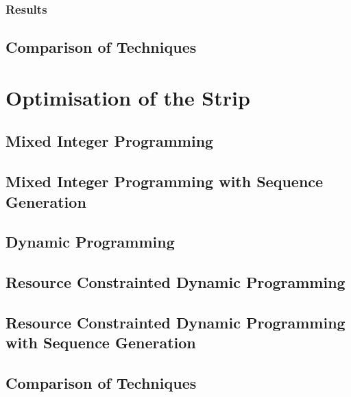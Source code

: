 \subsubsection{Results}




\subsection{Comparison of Techniques}

\section{Optimisation of the Strip}
\subsection{Mixed Integer Programming}
\subsection{Mixed Integer Programming with Sequence Generation}
\subsection{Dynamic Programming}
\subsection{Resource Constrainted Dynamic Programming}
\subsection{Resource Constrainted Dynamic Programming with Sequence Generation}
\subsection{Comparison of Techniques}



